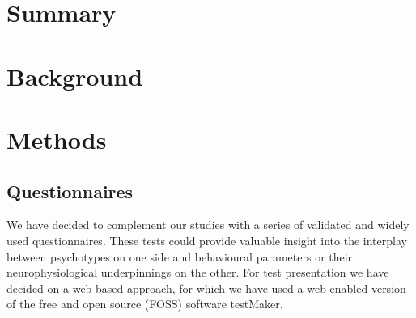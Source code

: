 
\chapter{Summary}
\readme
\chapter{Background}
    \section{}
\chapter{Methods}
    \section{Questionnaires}
	We have decided to complement our studies with a series of validated and widely used questionnaires.
	These tests could provide valuable insight into the interplay between psychotypes on one side and behavioural parameters or their neurophysiological underpinnings on the other.
	For test presentation we have decided on a web-based approach, for which we have used a web-enabled version of the free and open source (FOSS) software testMaker\cite{testmaker}.
	
